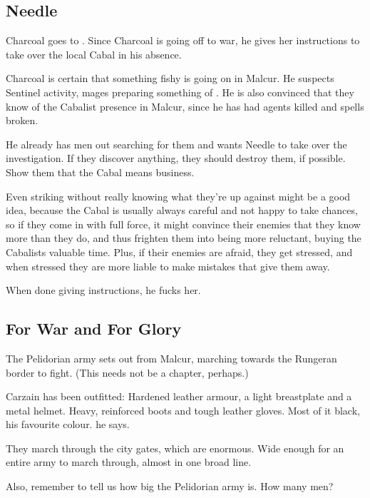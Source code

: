 \begin{garbage}
\subsection{Needle}
Charcoal goes to . Since Charcoal is going off to war, he gives her instructions to take over the local Cabal in his absence. 

Charcoal is certain that something fishy is going on in Malcur. He suspects Sentinel activity, mages preparing something of . He is also convinced that they know of the Cabalist presence in Malcur, since he has had agents killed and spells broken. 

He already has men out searching for them and wants Needle to take over the investigation. If they discover anything, they should destroy them, if possible. Show them that the Cabal means business. 

Even striking without really knowing what they're up against might be a good idea, because the Cabal is usually always careful and not happy to take chances, so if they come in with full force, it might convince their enemies that they know more than they do, and thus frighten them into being more reluctant, buying the Cabalists valuable time. Plus, if their enemies are afraid, they get stressed, and when stressed they are more liable to make mistakes that give them away. 

When done giving instructions, he fucks her. 









\subsection{For War and For Glory}
The Pelidorian army sets out from Malcur, marching towards the Rungeran border to fight. (This needs not be a chapter, perhaps.) 

Carzain has been outfitted: Hardened leather armour, a light breastplate and a metal helmet. Heavy, reinforced boots and tough leather gloves. Most of it black, his favourite colour.  he says.

They march through the \Malcuric{} city gates, which are enormous. Wide enough for an entire army to march through, almost in one broad line. 

Also, remember to tell us how big the Pelidorian army is. How many men?


\end{garbage}
